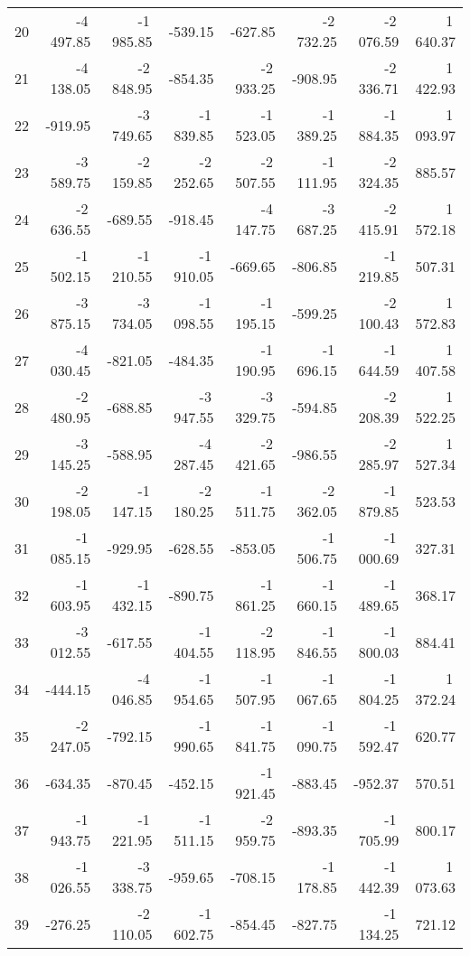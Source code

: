 \begin{longtable}{rrrrrrrr}
20 & -4\,497.85 & -1\,985.85 & -539.15 & -627.85 & -2\,732.25 & -2\,076.59 & 1\,640.37  \\
21 & -4\,138.05 & -2\,848.95 & -854.35 & -2\,933.25 & -908.95 & -2\,336.71 & 1\,422.93  \\
22 & -919.95 & -3\,749.65 & -1\,839.85 & -1\,523.05 & -1\,389.25 & -1\,884.35 & 1\,093.97  \\
23 & -3\,589.75 & -2\,159.85 & -2\,252.65 & -2\,507.55 & -1\,111.95 & -2\,324.35 & 885.57  \\
24 & -2\,636.55 & -689.55 & -918.45 & -4\,147.75 & -3\,687.25 & -2\,415.91 & 1\,572.18  \\
25 & -1\,502.15 & -1\,210.55 & -1\,910.05 & -669.65 & -806.85 & -1\,219.85 & 507.31  \\
26 & -3\,875.15 & -3\,734.05 & -1\,098.55 & -1\,195.15 & -599.25 & -2\,100.43 & 1\,572.83  \\
27 & -4\,030.45 & -821.05 & -484.35 & -1\,190.95 & -1\,696.15 & -1\,644.59 & 1\,407.58  \\
28 & -2\,480.95 & -688.85 & -3\,947.55 & -3\,329.75 & -594.85 & -2\,208.39 & 1\,522.25  \\
29 & -3\,145.25 & -588.95 & -4\,287.45 & -2\,421.65 & -986.55 & -2\,285.97 & 1\,527.34  \\
30 & -2\,198.05 & -1\,147.15 & -2\,180.25 & -1\,511.75 & -2\,362.05 & -1\,879.85 & 523.53  \\
31 & -1\,085.15 & -929.95 & -628.55 & -853.05 & -1\,506.75 & -1\,000.69 & 327.31  \\
32 & -1\,603.95 & -1\,432.15 & -890.75 & -1\,861.25 & -1\,660.15 & -1\,489.65 & 368.17  \\
33 & -3\,012.55 & -617.55 & -1\,404.55 & -2\,118.95 & -1\,846.55 & -1\,800.03 & 884.41  \\
34 & -444.15 & -4\,046.85 & -1\,954.65 & -1\,507.95 & -1\,067.65 & -1\,804.25 & 1\,372.24  \\
35 & -2\,247.05 & -792.15 & -1\,990.65 & -1\,841.75 & -1\,090.75 & -1\,592.47 & 620.77  \\
36 & -634.35 & -870.45 & -452.15 & -1\,921.45 & -883.45 & -952.37 & 570.51  \\
37 & -1\,943.75 & -1\,221.95 & -1\,511.15 & -2\,959.75 & -893.35 & -1\,705.99 & 800.17  \\
38 & -1\,026.55 & -3\,338.75 & -959.65 & -708.15 & -1\,178.85 & -1\,442.39 & 1\,073.63  \\
39 & -276.25 & -2\,110.05 & -1\,602.75 & -854.45 & -827.75 & -1\,134.25 & 721.12  \\

\end{longtable}
